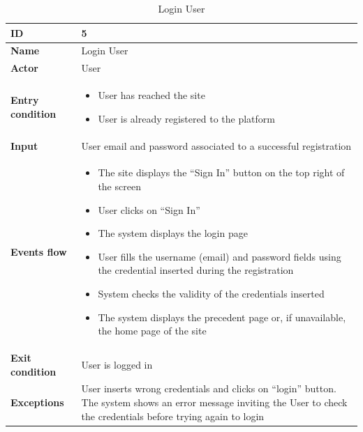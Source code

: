     \begin{longtable}{p{} | p{}}
     \caption{Login User}
        \label{tab:login_user}\\
        \hline
        \textbf{ID} & 5\\
        \hline
        \textbf{Name}  &  Login User\\
        \hline
        \textbf{Actor}  &  User\\
        \hline
        \textbf{Entry condition}  &  
        \begin{itemize}
                \item User has reached the site
                \item User is already registered to the platform
         \end{itemize}\\
        \hline
        \textbf{Input} & User email and password associated to a successful registration\\
        \hline
        \textbf{Events flow} & 
        \begin{itemize}
                \item The site displays the “Sign In” button on the top right of the screen
                \item User clicks on “Sign In”
                \item The system displays the login page
                \item User fills the username (email) and password fields using the credential inserted during the registration
                \item System checks the validity of the credentials inserted
                \item The system displays the precedent page or, if unavailable, the home page of the site
                 \end{itemize}
                 \\
        \hline
        \textbf{Exit condition} & User is logged in\\
        \hline
        \textbf{Exceptions} & User inserts wrong credentials and clicks on “login” button. The system shows an error message inviting the User to check the credentials before trying again to login\\
        \hline
       
    \end{longtable}
